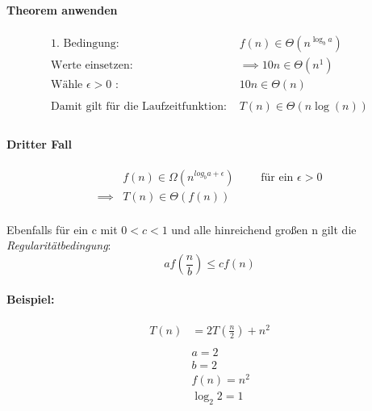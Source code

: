 \documentclass[a4paper]{scrartcl}
\begin{document}
	\paragraph{Theorem anwenden}
	\begin{align*}
	\text{1. Bedingung: } &f(n) \in \Theta(n^{\log_b a})\\
	\text{Werte einsetzen: } &\implies 10n \in \Theta(n^1)\\
	\text{Wähle \(\epsilon > 0\) : }  &10n \in \Theta(n) \\
	\\
	\text{Damit gilt für die Laufzeitfunktion: } &T(n) \in \Theta(n \log (n))\\ 
	\end{align*}
	
	\newpage
	\paragraph{Dritter Fall}
	\begin{align*}
	&f(n) \in \Omega(n^{log_b a + \epsilon}) \qquad \text{ für ein } \epsilon >0 \\
	\implies& T(n) \in \Theta(f(n))\\	
	\end{align*}
	
	Ebenfalls für ein c mit  \(0 < c < 1\) und alle hinreichend großen n gilt die \emph{Regularitätbedingung}:
	\[af(\frac{n}{b}) \leq cf(n)\]
	
	\paragraph{Beispiel:}
	\begin{align*}
	T(n)  &= 2T(\frac{n}{2}) + n^2 \\
	\\
	&a =2\\
	&b = 2\\
	&f(n) = n^2\\
	&\log_2 2 = 1\\
	\end{align*}
	
\end{document}
